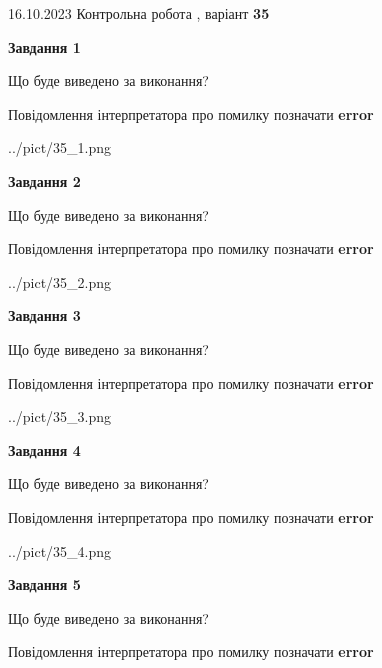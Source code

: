 \documentclass[12pt, ukrainian]{article}
\begin{document}
{\Large{16.10.2023 Контрольна робота , варіант  \No \textbf { 35 }\par}}
{
\begin {large}
{\begin {center}\textbf{Завдання 1}\end {center}}\par
Що буде виведено за виконання? \par
Повідомлення інтерпретатора про помилку позначати \textbf{error}

\begin{center}
	{../pict/35_1.png}
\end{center}
\newpage

{\begin {center}\textbf{Завдання 2}\end {center}}\par
Що буде виведено за виконання? \par
Повідомлення інтерпретатора про помилку позначати \textbf{error}

\begin{center}
	{../pict/35_2.png}
\end{center}
\newpage

{\begin {center}\textbf{Завдання 3}\end {center}}\par
Що буде виведено за виконання? \par
Повідомлення інтерпретатора про помилку позначати \textbf{error}

\begin{center}
	{../pict/35_3.png}
\end{center}
\newpage

{\begin {center}\textbf{Завдання 4}\end {center}}\par
Що буде виведено за виконання? \par
Повідомлення інтерпретатора про помилку позначати \textbf{error}

\begin{center}
	{../pict/35_4.png}
\end{center}
\newpage

{\begin {center}\textbf{Завдання 5}\end {center}}\par
Що буде виведено за виконання? \par
Повідомлення інтерпретатора про помилку позначати \textbf{error}


\end{large}}
\end{document}
